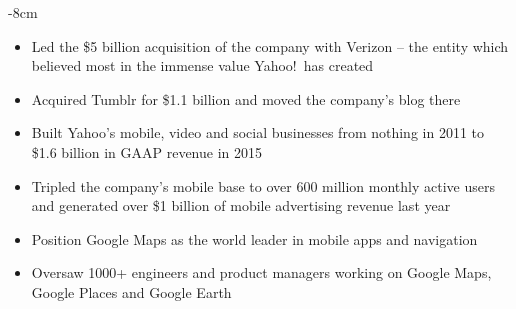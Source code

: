 \documentclass[10pt,a4paper]{altacv}
\begin{document}

\begin{adjustwidth}{}{-8cm}
\makecvheader
\end{adjustwidth}


\begin{itemize}
\item Led the \$5 billion acquisition of the company with Verizon -- the entity which believed most in the immense value Yahoo!\ has created
\item Acquired Tumblr for \$1.1 billion and moved the company's blog there
\item Built Yahoo's mobile, video and social businesses from nothing in 2011 to \$1.6 billion in GAAP revenue in 2015
\item Tripled the company's mobile base to over 600 million monthly active users and generated over \$1 billion of mobile advertising revenue last year
\end{itemize}

\divider

\begin{itemize}
\item Position Google Maps as the world leader in mobile apps and navigation
\item Oversaw 1000+ engineers and product managers working on Google Maps, Google Places and Google Earth
\end{itemize}
\end{document}
